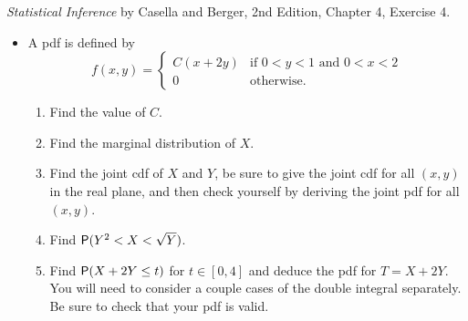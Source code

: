 \documentclass[12pt]{article}
\newcommand{\Prob}{{\sf P}}
\newenvironment{problem}[2][Problem]{\begin{trivlist}
\item[\hskip \labelsep {\bfseries #1}\hskip \labelsep {\bfseries #2.}]}
{\end{trivlist}}
\begin{document}
\begin{problem}{5}
  \textit{Statistical Inference} by Casella and Berger, 2nd Edition, Chapter 4, 
  Exercise 4.
  \begin{itemize}
    \item [4.] A pdf is defined by
    \[
      f(x,y) = \begin{cases}
        C(x+2y) & \text{if } 0 < y < 1 \text{ and } 0 < x < 2 \\
        0 & \text{otherwise.}
      \end{cases}
    \]
    \begin{enumerate}
      \item Find the value of $C$.
      \item Find the marginal distribution of $X$.
      \item Find the joint cdf of $X$ and $Y$, be sure to give
      the joint cdf for all $(x,y)$ in the real plane, and then
      check yourself by deriving the joint pdf for all $(x,y)$.
      \item Find $\Prob(Y^2 < X < \sqrt{Y})$.
      \item Find $\Prob(X + 2Y \le t)$ for $t \in [0,4]$ and deduce the
      pdf for $T = X + 2Y$. You will need to consider a couple cases
      of the double integral separately. Be sure to check that your
      pdf is valid.
    \end{enumerate}


\end{itemize}
\end{problem}
\end{document}
